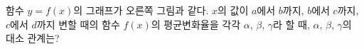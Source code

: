 \noindent\begin{minipage}[t]{0.58\linewidth}\vspace{0pt}\raggedright 함수 $y=f(x)$의 그래프가 오른쪽 그림과 같다. $x$의 값이 $a$에서 $b$까지, $b$에서 $c$까지, $c$에서 $d$까지 변할 때의 함수 $f(x)$의 평균변화율을 각각 $\alpha$, $\beta$, $\gamma$라 할 때, $\alpha$, $\beta$, $\gamma$의 대소 관계는? \end{minipage}\hfill\begin{minipage}[t]{0.4\linewidth}\vspace{0pt}\centering \resizebox{\ifdim\width>\linewidth\linewidth\else\width\fi}{!}{}\end{minipage}\par
\dmchoicesauto{}{$\alpha<\beta<\gamma$}{$\alpha=\beta<\gamma$}{$\beta<\alpha<\gamma$}{$\beta<\gamma<\alpha$}{$\gamma<\beta<\alpha$}
